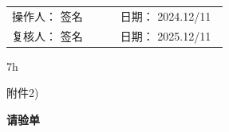 \documentclass[UTF8,10pt,a4paper,fontset=fandol]{ctexart}
\newcommand{\fieldvalue}[1]{#1}
\newcommand{\handwritten}[1]{#1}
\begin{document}
\vfill

\noindent
\begin{tabular}{@{}p{0.47\linewidth}p{0.47\linewidth}@{}}
操作人：
\fieldvalue{\handwritten{签名}}
&
日期：
\fieldvalue{\handwritten{2024.12/11}}
\\[0.8em]
复核人：
\fieldvalue{\handwritten{签名}}
&
日期：
\fieldvalue{\handwritten{2025.12/11}}
\end{tabular}

\vspace{2em}

\handwritten{7h}

\newpage

\handwritten{附件2)}

\begin{center}
\textbf{请验单}
\end{center}
\end{document}
